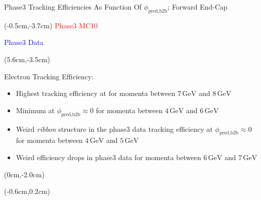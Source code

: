 \documentclass[8pt]{beamer}
\begin{document}
\begin{frame}{Phase3 Tracking Efficiencies As Function Of $\phi_{\textrm{pred,b2b}}$; Forward End-Cap}
	\begin{textblock*}{4cm}(-0.5cm,-3.7cm)
		\textcolor{red}{Phase3 MC10}
		
		\textcolor{blue}{Phase3 Data}
	\end{textblock*}
	
	
		\pause[2]
	
	
	\begin{textblock*}{6cm}(5.6cm,-3.5cm)
		\begin{mybox}
			Electron Tracking Efficiency:
			\begin{itemize}
				\item<2-> Highest tracking efficiency at for momenta between $7\,\textrm{GeV}$ and $8\,\textrm{GeV}$
				\item<3-> Minimum at $\phi_{\textrm{pred,b2b}} \approx 0$ for momenta between $4\,\textrm{GeV}$ and $6\,\textrm{GeV}$
				\item<4-> Weird \textit{ribbon} structure in the phase3 data tracking efficiency at $\phi_{\textrm{pred,b2b}} \approx 0$ for momenta between $4\,\textrm{GeV}$ and $5\,\textrm{GeV}$
				\item<5-> Weird efficiency drops in phase3 data for momenta between $6\,\textrm{GeV}$ and $7\,\textrm{GeV}$
			\end{itemize}
		\end{mybox}
	\end{textblock*}
	
	
	\begin{textblock*}{5cm}(0cm,-2.0cm)
	\end{textblock*}
	
	
	\begin{textblock*}{5cm}(-0.6cm,0.2cm)
	\end{textblock*}
	
	\pause[6]
\end{frame}
\end{document}
